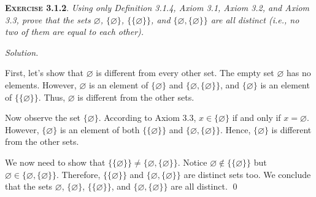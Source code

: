 \documentclass[12pt]{article}
\theoremstyle{remark}
\newenvironment{exer}[2]{
    \noindent \setlength{\parskip}{1em}%
    \textsc{\textbf{Exercise #1}}. \textit{#2} \par
    \noindent \textit{Solution.} %
}{\bigskip}
\begin{document}
\begin{exer}{3.1.2}{
    Using only Definition 3.1.4, Axiom 3.1, Axiom 3.2, and Axiom 3.3, prove that the sets $\varnothing$, $\{ \varnothing \}$, $\{ \{ \varnothing \} \}$, and $\{ \varnothing, \{ \varnothing \} \}$ are all distinct (i.e., no two of them are equal to each other).
}
    First, let's show that $\varnothing$ is different from every other set.
    The empty set $\varnothing$ has no elements.
    However, $\varnothing$ is an element of $\{ \varnothing \}$ and $\{\varnothing, \{ \varnothing \} \}$, and $\{ \varnothing \}$ is an element of $\{ \{ \varnothing \} \}$.
    Thus, $\varnothing$ is different from the other sets.

    Now observe the set $\{ \varnothing \}$.
    According to Axiom 3.3, $x \in \{ \varnothing \}$ if and only if $x = \varnothing$.
    However, $\{ \varnothing \}$ is an element of both $\{ \{ \varnothing \} \}$ and $\{ \varnothing, \{ \varnothing \} \}$.
    Hence, $\{ \varnothing \}$ is different from the other sets.

    We now need to show that $\{ \{ \varnothing \} \} \ne \{ \varnothing, \{ \varnothing \} \}$.
    Notice $\varnothing \notin \{ \{ \varnothing \} \}$ but $\varnothing \in \{ \varnothing, \{ \varnothing \} \}$.
    Therefore, $\{ \{ \varnothing \} \}$ and $\{ \varnothing, \{ \varnothing \} \}$ are distinct sets too. We conclude that the sets $\varnothing$, $\{ \varnothing \}$, $\{ \{ \varnothing \} \}$, and $\{ \varnothing, \{ \varnothing \} \}$ are all distinct. \qed
\end{exer}
\end{document}
